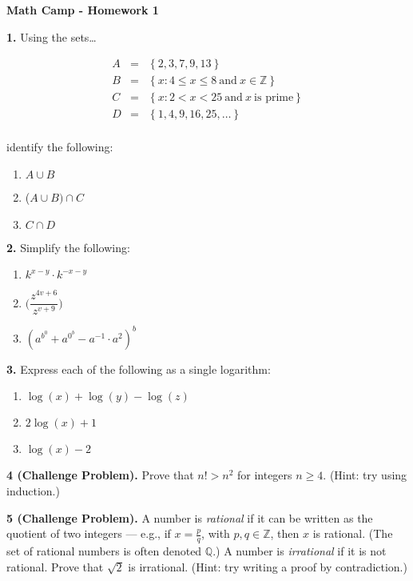 \documentclass[12pt]{article}
\newcommand{\Z}{\mathbb{Z}}
\begin{document}
\centerline{\bf Math Camp - Homework 1}


\bigskip

\noindent \textbf{1.} Using the sets\ldots

\begin{eqnarray*}
A&=&\left\{2,3,7,9,13 \right\} \\
B&=&\left\{ x: 4\leq x \leq 8 \  \mbox{and} \ x \in \Z \right\} \\
C&=&\left\{ x: 2< x < 25 \  \mbox{and} \  x \  \mbox{is prime}  \right\} \\
D&=&\left\{ 1,4,9,16,25, \ldots  \right\} \\
\end{eqnarray*}

identify the following:


\bigskip

\begin{enumerate}
\item $A\cup B$
\item ($A\cup B) \cap C$
\item $C \cap D$
\end{enumerate}

\bigskip

\noindent \textbf{2.} Simplify the following:

\begin{enumerate}
\item $k^{x-y}\cdot k^{-x-y} $
\item     $\bigg (   \dfrac{z^{4v+6}}{z^{v+9}} \bigg )$
\item  $(a^{b^0} + a^{0^b} - a^{-1} \cdot a^2)^b $
\end{enumerate}

\bigskip 

\noindent \textbf{3.} Express each of the following as a single logarithm:

\begin{enumerate}
\item $ \log(x) + \log(y) - \log(z)    $
\item  $  2\log(x) + 1   $
\item  $  \log(x) - 2   $
\end{enumerate}

\bigskip

\textbf{4 (Challenge Problem).}	Prove that $n! > n^2$ for integers $n \ge 4$. (Hint: try using induction.)


\bigskip

\textbf{5 (Challenge Problem).} A number is  \emph{rational} if it can be written as the quotient of two integers --- e.g., if $x = \frac{p}{q}$, with $p, q \in \mathbb{Z}$, then $x$ is rational. (The set of rational numbers is often denoted $\mathbb{Q}$.) A number is  \emph{irrational} if it is not rational. Prove that $\sqrt{2}$ is irrational.  (Hint: try writing a proof by contradiction.)
\end{document}
